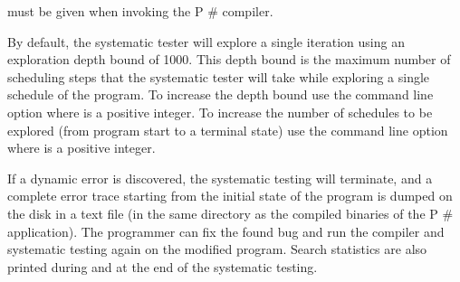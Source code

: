 \documentclass{article}
\begin{document}
\begin{mdDiv}[class={body,madoko},elem={body},line-adjust={0}]
\begin{mdP}[class={indent},data-line={859}]
{}%
{} must be given when invoking
the P%
{}\#%
{} compiler.%
\end{mdP}%
\begin{mdP}[class={indent},data-line={862}]%
{}By default, the systematic tester will explore a single iteration using an exploration
depth bound of 1000. This depth bound is the maximum number of scheduling steps that
the systematic tester will take while exploring a single schedule of the program. To
increase the depth bound use the command line option %
{}%
{} where %
{}%
{} is a positive
integer. To increase the number of schedules to be explored (from program start to a
terminal state) use the command line option %
{}%
{} where %
{}%
{} is a positive integer.%
\end{mdP}%
\begin{mdP}[class={indent},data-line={869}]%
{}If a dynamic error is discovered, the systematic testing will terminate, and a complete
error trace starting from the initial state of the program is dumped on the disk in a
text file (in the same directory as the compiled binaries of the P%
{}\#%
{} application). The
programmer can fix the found bug and run the compiler and systematic testing again on
the modified program. Search statistics are also printed during and at the end of the
systematic testing.%
\end{mdP}%
\end{mdDiv}
\end{document}
